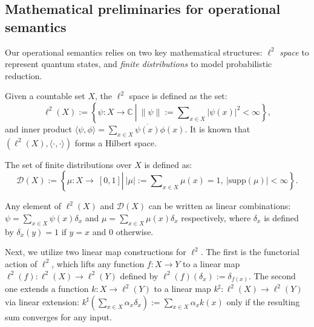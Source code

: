 \subsection{Mathematical preliminaries for operational semantics} \label{sec:math-prelim}
Our operational semantics relies on two key mathematical structures: $\ell^2$ \textit{space} to represent quantum states, and \textit{finite distributions} to model probabilistic reduction.

\begin{dfn}
  Given a countable set $X$, the $\ell^2$ space is defined as the set:
  \begin{equation*}
    \ell^2(X) := \left\{\psi : X\to\mathbb{C}\ \left|\ \|\psi\| := \sum\nolimits_{x\in X} |\psi(x)|^2 < \infty \right.\right\},
  \end{equation*}
  and inner product $\langle \psi, \phi \rangle = \sum\nolimits_{x\in X} \overline{\psi(x)} \phi(x)$.
  It is known that $(\ell^2(X), \langle\cdot,\cdot\rangle)$ forms a Hilbert space.
\end{dfn}

\begin{dfn}
  The set of finite distributions over $X$ is defined as:
  \begin{equation*}
    \mathcal{D}(X) := \left\{\mu : X \to \ [0,1] \left|\ |\mu| := \sum\nolimits_{x\in X} \mu(x) = 1,\ |\mathrm{supp}(\mu)| < \infty\right.\right\}.
  \end{equation*}
\end{dfn}
Any element of $\ell^2(X)$ and $\mathcal{D}(X)$ can be written as linear combinations: $\psi = \sum_{x\in X} \psi(x) \delta_x$ and $\mu = \sum_{x\in X} \mu(x)\delta_x$ respectively, where $\delta_x$ is defined by $\delta_x(y) = 1$ if $y = x$ and $0$ otherwise.

Next, we utilize two linear map constructions for $\ell^2$.
The first is the functorial action of $\ell^2$, which lifts any function $f: X \to Y$ to a linear map $\ell^2(f): \ell^2(X) \to \ell^2(Y)$ defined by $\ell^2(f)(\delta_x) := \delta_{f(x)}$.
The second one extends a function $k: X \to \ell^2(Y)$ to a linear map $k^\sharp: \ell^2(X) \to \ell^2(Y)$ via linear extension: $k^\sharp(\sum_{x \in X} \alpha_x \delta_x) := \sum_{x \in X} \alpha_x k(x)$ only if the resulting sum converges for any input.